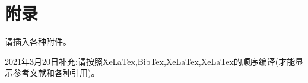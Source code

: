 \titleformat{\chapter}{\centering\sihao\hei}{\chaptername}{2em}{}
\chapter*{\centering\xiaosan\hei 附\quad 录}
请插入各种附件。

2021年3月20日补充:请按照XeLaTex,BibTex,XeLaTex,XeLaTex的顺序编译(才能显示参考文献和各种引用)。
